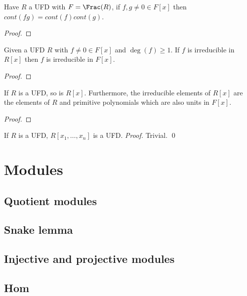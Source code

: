 \documentclass{report}
\begin{document}
\begin{lemma}
    Have $R$ a UFD with $F=\Frac(R)$, if $f,g\neq0\in F[x]$ then $cont(fg)=cont(f)cont(g)$.\begin{proof}
        
    \end{proof}
\end{lemma}

\begin{corollary}
    Given a UFD $R$ with $f\neq0\in F[x]$ and $\deg(f)\geq 1$. If $f$ is irreducible in $R[x]$ then $f$ is irreducible in $F[x]$.\begin{proof}
        
    \end{proof}
\end{corollary}

\begin{theorem}
    If $R$ is a UFD, so is $R[x]$. Furthermore, the irreducible elements of $R[x]$ are the elements of $R$ and primitive polynomials which are also units in $F[x]$. \begin{proof}
        
    \end{proof}
\end{theorem}

\begin{corollary}
    If $R$ is a UFD, $R[x_1,\ldots,x_n]$ is a UFD. \textit{Proof.} Trivial. \qed
\end{corollary}

\section{Modules}
\setcounter{subsection}{1}

\subsection{Quotient modules}

\subsection{Snake lemma}

\subsection{Injective and projective modules}

\subsection{Hom}
\end{document}
